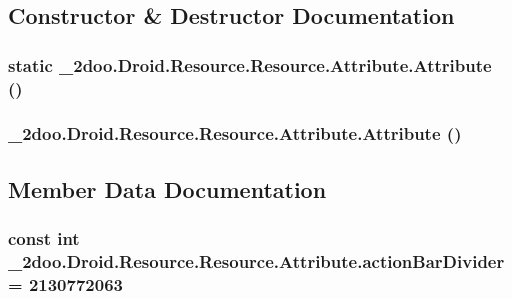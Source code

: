 \subsection{Constructor \& Destructor Documentation}
\hypertarget{class__2doo_1_1_droid_1_1_resource_1_1_attribute_cf00e5fc47e5997a92f0a6971adc43d6}{
\subsubsection[{Attribute}]{\setlength{\rightskip}{0pt plus 5cm}static \_\-2doo.Droid.Resource.Resource.Attribute.Attribute ()}}
\label{class__2doo_1_1_droid_1_1_resource_1_1_attribute_cf00e5fc47e5997a92f0a6971adc43d6}


\hypertarget{class__2doo_1_1_droid_1_1_resource_1_1_attribute_ea53197985a8f8346d803240d0d7649b}{
\subsubsection[{Attribute}]{\setlength{\rightskip}{0pt plus 5cm}\_\-2doo.Droid.Resource.Resource.Attribute.Attribute ()}}
\label{class__2doo_1_1_droid_1_1_resource_1_1_attribute_ea53197985a8f8346d803240d0d7649b}




\subsection{Member Data Documentation}
\hypertarget{class__2doo_1_1_droid_1_1_resource_1_1_attribute_56a231fb42d54d2cea70de041f6bf723}{
\subsubsection[{actionBarDivider}]{\setlength{\rightskip}{0pt plus 5cm}const int \_\-2doo.Droid.Resource.Resource.Attribute.actionBarDivider = 2130772063}}
\label{class__2doo_1_1_droid_1_1_resource_1_1_attribute_56a231fb42d54d2cea70de041f6bf723}


